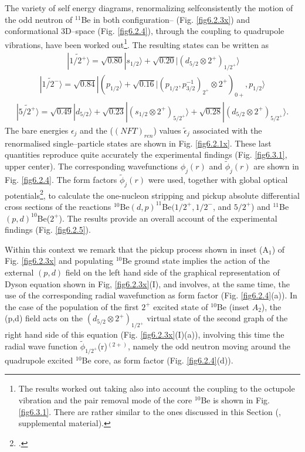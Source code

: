 The variety of self energy diagrams, renormalizing selfconsistently  
   the motion 
   of the odd neutron of $^{11}$Be in both configuration-- (Fig. \ref{fig6.2.3x}) 
   and conformational 3D--space (Fig. \ref{fig6.2.4}), through the coupling to quadrupole vibrations, have been worked out\footnote{The results worked out taking also into account the coupling to the octupole vibration and the pair removal mode of the core $^{10}$Be is shown in Fig. \ref{fig6.3.1}. There are rather similar to the ones discussed in this Section (\cite{Barranco:17}, supplemental material).}.
   The resulting states can be written as 
   \begin{align}\label{eq6.2.1}
     \ |\widetilde{1/2^+} \rangle  =  \sqrt{0.80} |s_{1/2}\rangle + \sqrt{0.20} |(d_{5/2}\otimes 2^+)_{1/2^+}\rangle    
     \end{align}
     \begin{align}\label{eq6.2.2}
     |\widetilde{1/2^-}\rangle =  \sqrt{0.84} |(p_{1/2}\rangle + \sqrt{0.16} |(p_{1/2},p^{-1}_{3/2})_{2^+}
   \otimes 2^+)_{0+}, p_{1/2}\rangle 
   \end{align}
        \begin{align}\label{eq6.2.3}
   |\widetilde{5/2^+}\rangle  =\sqrt{0.49} |d_{5/2}\rangle+ \sqrt{0.23}|(s_{1/2}\otimes 2^+)_{5/2^+} \rangle  
   + \sqrt{0.28} |(d_{5/2}\otimes 2^+)_{5/2^+} \rangle. 
   \end{align}  
   The  bare energies $\epsilon_j$ and the ($(NFT)_{ren}$) values  $\tilde \epsilon_j$ 
   associated with the renormalised single--particle states 
   are shown in Fig. \ref{fig6.2.1x}. These last quantities reproduce quite accurately the experimental findings (Fig. \ref{fig6.3.1}, upper center). The corresponding wavefunctions $\phi_j(r)$ and $\tilde \phi_j(r)$
   are shown in Fig. \ref{fig6.2.4}.
   The  form factors $\tilde\phi_j(r)$  were used,  
   together with  global optical  potentials\footnote{\cite{Han:06,Koning:03}.}, to calculate the one-nucleon stripping and pickup absolute differential 
   cross sections of the reactions $^{10}$Be$(d,p)^{11}$Be$(1/2^+,1/2^-$, and $5/2^+$) and $^{11}$Be$(p,d)^{10}$Be($2^+$). The results provide an overall account  of the experimental 
   findings  (Fig. \ref{fig6.2.5}).
   
   
   
    Within this context we remark that  the pickup process shown in inset
   (A$_1$) of Fig. \ref{fig6.2.3x} and populating $^{10}$Be ground state  implies the action of
   the external $(p,d)$ field on the left hand side of the graphical representation of Dyson equation shown in Fig, 
   \ref{fig6.2.3x}(I), and involves, at the same time, the use of the corresponding radial wavefunction
   as form factor (Fig. \ref{fig6.2.4}(a)). 
   In the case of the population of the first $2^+$ excited state of $^{10}$Be (inset $A_2$), the (p,d) field acts on the 
   $(d_{5/2} \otimes 2^+)_{1/2^+}$ virtual state of the second graph of the right hand side   of this equation
   (Fig. \ref{fig6.2.3x}(I)(a)), involving this time the radial wave function 
   $\tilde \phi_{1/2^+}$(r)$^{(2+)}$, namely the odd neutron moving around the quadrupole excited $^{10}$Be core,  as  form factor (Fig. \ref{fig6.2.4}(d)). 
   
